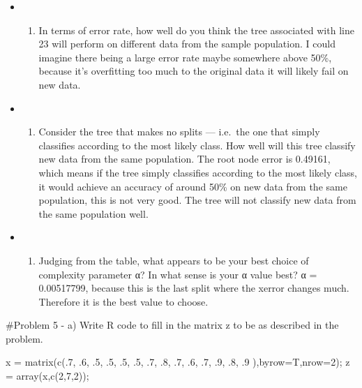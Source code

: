 \documentclass[
]{article}
\newenvironment{Shaded}{\begin{snugshade}}{\end{snugshade}}
\newcommand{\AttributeTok}[1]{\textcolor[rgb]{0.77,0.63,0.00}{#1}}
\newcommand{\DecValTok}[1]{\textcolor[rgb]{0.00,0.00,0.81}{#1}}
\newcommand{\FunctionTok}[1]{\textcolor[rgb]{0.00,0.00,0.00}{#1}}
\newcommand{\NormalTok}[1]{#1}
\newcommand{\OtherTok}[1]{\textcolor[rgb]{0.56,0.35,0.01}{#1}}
\providecommand{\tightlist}{%
  \setlength{\itemsep}{0pt}\setlength{\parskip}{0pt}}
\begin{document}
\begin{itemize}
\item
  \begin{enumerate}
  \def\labelenumi{\alph{enumi})}
  \setcounter{enumi}{1}
  \tightlist
  \item
    In terms of error rate, how well do you think the tree associated
    with line 23 will perform on different data from the sample
    population. I could imagine there being a large error rate maybe
    somewhere above 50\%, because it's overfitting too much to the
    original data it will likely fail on new data.
  \end{enumerate}
\item
  \begin{enumerate}
  \def\labelenumi{\alph{enumi})}
  \setcounter{enumi}{2}
  \tightlist
  \item
    Consider the tree that makes no splits --- i.e.~the one that simply
    classifies according to the most likely class. How well will this
    tree classify new data from the same population. The root node error
    is 0.49161, which means if the tree simply classifies according to
    the most likely class, it would achieve an accuracy of around 50\%
    on new data from the same population, this is not very good. The
    tree will not classify new data from the same population well.
  \end{enumerate}
\item
  \begin{enumerate}
  \def\labelenumi{\alph{enumi})}
  \setcounter{enumi}{3}
  \tightlist
  \item
    Judging from the table, what appears to be your best choice of
    complexity parameter α? In what sense is your α value best? α =
    0.00517799, because this is the last split where the xerror changes
    much. Therefore it is the best value to choose.
  \end{enumerate}
\end{itemize}

\#Problem 5 - a) Write R code to fill in the matrix z to be as described
in the problem.

\begin{Shaded}
\begin{Highlighting}[]
\NormalTok{x }\OtherTok{=} \FunctionTok{matrix}\NormalTok{(}\FunctionTok{c}\NormalTok{(.}\DecValTok{7}\NormalTok{, .}\DecValTok{6}\NormalTok{, .}\DecValTok{5}\NormalTok{, .}\DecValTok{5}\NormalTok{, .}\DecValTok{5}\NormalTok{, .}\DecValTok{5}\NormalTok{, .}\DecValTok{7}\NormalTok{, .}\DecValTok{8}\NormalTok{, .}\DecValTok{7}\NormalTok{, .}\DecValTok{6}\NormalTok{, .}\DecValTok{7}\NormalTok{, .}\DecValTok{9}\NormalTok{, .}\DecValTok{8}\NormalTok{, .}\DecValTok{9}\NormalTok{ ),}\AttributeTok{byrow=}\NormalTok{T,}\AttributeTok{nrow=}\DecValTok{2}\NormalTok{);}
\NormalTok{z }\OtherTok{=} \FunctionTok{array}\NormalTok{(x,}\FunctionTok{c}\NormalTok{(}\DecValTok{2}\NormalTok{,}\DecValTok{7}\NormalTok{,}\DecValTok{2}\NormalTok{));}
\end{Highlighting}
\end{Shaded}
\end{document}
